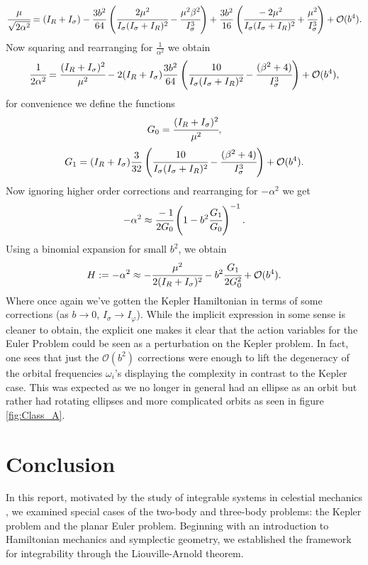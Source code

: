 \documentclass[12pt,oneside]{report}
\theoremstyle{definition}
\begin{document}
$$\cfrac{\mu}{\sqrt{2\alpha^{2}}} = (I_{R}+I_{\sigma}) - \frac{3b^{2}}{64}\left(\cfrac{2\mu^{2}}{I_{\sigma}(I_{\sigma}+I_{R})^{2}} - \cfrac{\mu^{2}\beta^{2}}{I_{\sigma}^{3}} \right) +\frac{3b^{2}}{16}\left( \cfrac{-2\mu^{2}}{I_{\sigma}(I_{\sigma}+I_{R})^{2}} + \cfrac{\mu^{2}}{I_{\sigma}^{3}}\right) + \mathcal{O}(b^{4}).$$
Now squaring and rearranging for $\frac{1}{\alpha^{2}}$ we obtain
 $$ \cfrac{1}{2\alpha^{2}} = \cfrac{(I_{R}+I_{\sigma})^{2}}{\mu^{2}} - 2(I_{R}+I_{\sigma})\frac{3b^{2}}{64}\left(\cfrac{10}{I_{\sigma}(I_{\sigma}+I_{R})^{2}} - \cfrac{(\beta^{2}+4)}{I_{\sigma}^{3}} \right) + \mathcal{O}(b^{4}), $$
for convenience we define the functions
$$ G_{0} = \cfrac{(I_{R}+I_{\sigma})^{2}}{\mu^{2}},$$
$$G_{1} = (I_{R}+I_{\sigma})\frac{3}{32}\left(\cfrac{10}{I_{\sigma}(I_{\sigma}+I_{R})^{2}} - \cfrac{(\beta^{2}+4)}{I_{\sigma}^{3}} \right) + \mathcal{O}(b^{4}). $$
Now ignoring higher order corrections and rearranging for $-\alpha^{2}$ we get
$$ -\alpha^{2} \approx \cfrac{-1}{2G_{0}}\left(1-b^{2}\cfrac{G_{1}}{G_{0}}\right)^{-1}.$$
Using a binomial expansion for small \(b^{2}\), we obtain
$$ H := -\alpha^{2} \approx -\cfrac{\mu^{2}}{2(I_{R}+I_{\sigma})^{2}} -b^{2}\cfrac{G_{1}}{2G_{0}^{2}} + \mathcal{O}(b^{4}).$$
Where once again we've gotten the Kepler Hamiltonian in terms of some corrections (as $b \rightarrow 0$, $I_{\sigma} \rightarrow I_{\varphi}$). While the implicit expression in some sense is cleaner to obtain, the explicit one makes it clear that the action variables for the Euler Problem could be seen as a perturbation on the Kepler problem. In fact, one sees that just the $\mathcal{O}(b^{2})$ corrections were enough to lift the degeneracy of the orbital frequencies $\omega_{i}$'s displaying the complexity in contrast to the Kepler case. This was expected as we no longer in general had an ellipse as an orbit but rather had rotating ellipses and more complicated orbits as seen in figure \ref{fig:Class_A}.













\chapter{Conclusion}
In this report, motivated by the study of integrable systems in celestial mechanics \cite{o2008integrable}, we examined special cases of the two-body and three-body problems: the Kepler problem and the planar Euler problem. Beginning with an introduction to Hamiltonian mechanics and symplectic geometry, we established the framework for integrability through the Liouville-Arnold theorem.
\end{document}
